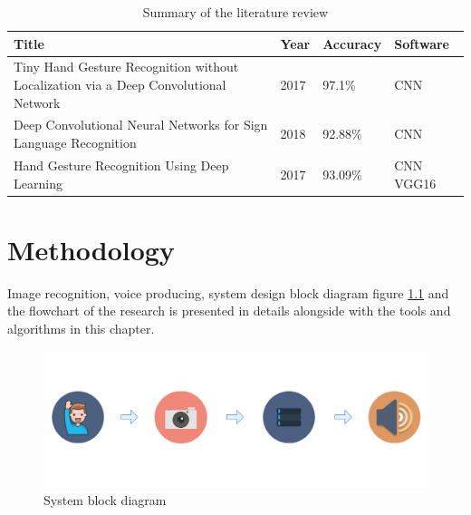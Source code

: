 \documentclass[12pt]{report}
\begin{document}
                    \begin{center}
                        \begin{table}[h]
                            \caption{Summary of the literature review}
                            \begin{tabular}{ |p{7cm}|p{2cm}|p{2cm}|p{3cm}| }
                                \hline
                                Title & Year & Accuracy & Software\\
                                \hline
                                Tiny Hand Gesture Recognition without Localization via a Deep Convolutional Network & 2017 & 97.1\%& CNN \\
                                \hline
                                Deep Convolutional Neural Networks for Sign Language Recognition & 2018 & 92.88\% & CNN \\
                                \hline
                                Hand Gesture Recognition Using Deep Learning & 2017 & 93.09\% & CNN VGG16 \\
                                \hline
                            \end{tabular}
                            \label{table:summary}
                        \end{table}
                    \end{center}
        \newpage

    \chapter{Methodology}
         
            Image recognition, voice producing, system design block diagram figure \ref{fig:system_diagram} 
            and the flowchart of the research is presented in details alongside with the tools
            and algorithms in this chapter.
            
            \begin{figure}[h]
                \centering
                \includegraphics[width=\textwidth]{./images/system_diagram.png}
                \caption{System block diagram}
                \label{fig:system_diagram}
            \end{figure}
        
\end{document}
